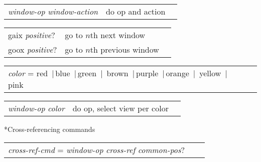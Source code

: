 \documentclass[twocolumn,10pt]{article}
\makeatletter
\renewcommand{\subsection}{\@startsection
  {subsection}{2}{0mm}{-.1\baselineskip}{-.1\baselineskip}%
  {\normalfont\bfseries}}
\newcommand{\vbar}{$\,|\,$}
\newcommand{\command}[1]{\textsf{\textup{#1}}}
\newcommand{\cat}[1]{\textrm{\textit{#1}}}
\newenvironment{mycenter}
{\begin{trivlist}\item \begin{footnotesize}}
{\end{footnotesize}\end{trivlist}}
\makeatother
\begin{document}
  \begin{mycenter}
    \begin{tabular}[t]{lll}
      \cat{window-op} \cat{window-action} & do op and action
    \end{tabular}
  \end{mycenter}

  \begin{mycenter}
    \begin{tabular}[t]{lll}
      \command{gaix} \cat{positive}?& go to $n$th next window\\
      \command{goox} \cat{positive}?& go to $n$th previous window\\
    \end{tabular}
  \end{mycenter}

  \begin{mycenter}
    \begin{tabular}[t]{lll}
      \cat{color} =  \command{red} \vbar \command{blue} \vbar \command{green} \vbar
      \command{brown} \vbar  \command{purple} \vbar  \command{orange} \vbar
      \command{yellow} \vbar \command{pink}
    \end{tabular}
  \end{mycenter}

  \begin{mycenter}
    \begin{tabular}[t]{lll}
      \cat{window-op} \cat{color} & do op, select view per color
    \end{tabular}
  \end{mycenter}

  \subsection*{Cross-referencing commands}
  \begin{mycenter}
    \begin{tabular}[t]{lll}
      \cat{cross-ref-cmd} = \cat{window-op} \cat{cross-ref} \cat{common-pos}?
    \end{tabular}
  \end{mycenter}
\end{document}
